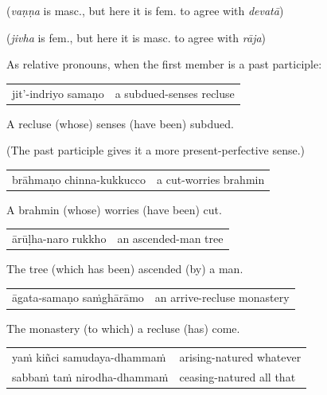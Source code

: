 \documentclass[11pt,oneside]{memoir}
\begin{document}
(\emph{vaṇṇa} is masc., but here it is fem. to agree with \emph{devatā})

(\emph{jivha} is fem., but here it is masc. to agree with \emph{rāja})

As relative pronouns, when the first member is a past participle:

\begin{center}
\begin{tabular}{ll}
jit'-indriyo samaṇo & a subdued-senses recluse\\[0pt]
\end{tabular}
\end{center}

A recluse (whose) senses (have been) subdued.

(The past participle gives it a more present-perfective sense.)

\begin{center}
\begin{tabular}{ll}
brāhmaṇo chinna-kukkucco & a cut-worries brahmin\\[0pt]
\end{tabular}
\end{center}

A brahmin (whose) worries (have been) cut.

\begin{center}
\begin{tabular}{ll}
ārūḷha-naro rukkho & an ascended-man tree\\[0pt]
\end{tabular}
\end{center}

The tree (which has been) ascended (by) a man.

\begin{center}
\begin{tabular}{ll}
āgata-samaṇo saṁghārāmo & an arrive-recluse monastery\\[0pt]
\end{tabular}
\end{center}

The monastery (to which) a recluse (has) come.

\begin{center}
\begin{tabular}{ll}
yaṁ kiñci samudaya-dhammaṁ & arising-natured whatever\\[0pt]
sabbaṁ taṁ nirodha-dhammaṁ & ceasing-natured all that\\[0pt]
\end{tabular}
\end{center}
\end{document}
